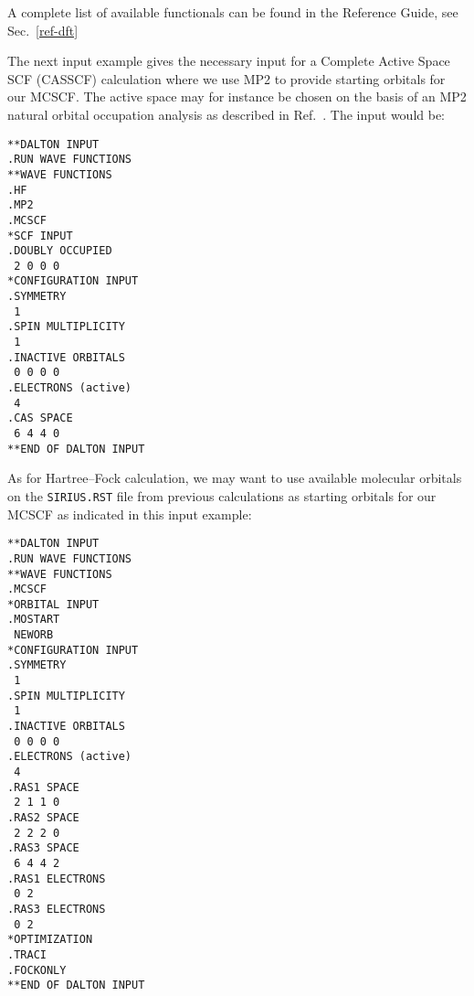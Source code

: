A complete list of available functionals can be found in the Reference Guide, see Sec.~\ref{ref-dft}

\begin{center}
\end{center}

The next input example gives the necessary input for a Complete
Active Space SCF (CASSCF) calculation where we use MP2 to provide
starting orbitals
for our MCSCF. The
active space may for instance be
chosen on the basis of an MP2 natural orbital occupation
analysis as
described in Ref.~\cite{hjajpjhajojcp88}. The input would be:

\begin{verbatim}
**DALTON INPUT
.RUN WAVE FUNCTIONS
**WAVE FUNCTIONS
.HF
.MP2
.MCSCF
*SCF INPUT
.DOUBLY OCCUPIED
 2 0 0 0
*CONFIGURATION INPUT
.SYMMETRY
 1
.SPIN MULTIPLICITY
 1
.INACTIVE ORBITALS
 0 0 0 0
.ELECTRONS (active)
 4
.CAS SPACE
 6 4 4 0
**END OF DALTON INPUT
\end{verbatim}
\label{sirius_ex3}

As for Hartree--Fock calculation, we may want to use available
molecular orbitals on the \verb|SIRIUS.RST| file
from previous 
calculations as starting orbitals for our
MCSCF as indicated in this input example:

\begin{verbatim}
**DALTON INPUT
.RUN WAVE FUNCTIONS
**WAVE FUNCTIONS
.MCSCF
*ORBITAL INPUT
.MOSTART
 NEWORB
*CONFIGURATION INPUT
.SYMMETRY
 1
.SPIN MULTIPLICITY
 1
.INACTIVE ORBITALS
 0 0 0 0
.ELECTRONS (active)
 4
.RAS1 SPACE
 2 1 1 0
.RAS2 SPACE
 2 2 2 0
.RAS3 SPACE
 6 4 4 2
.RAS1 ELECTRONS
 0 2
.RAS3 ELECTRONS
 0 2
*OPTIMIZATION
.TRACI
.FOCKONLY
**END OF DALTON INPUT
\end{verbatim}
\label{sirius_ex4}

